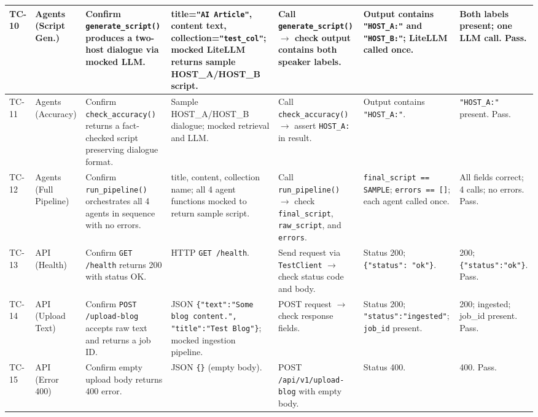 \documentclass[sigconf,natbib=false]{acmart}   %
\begin{document}
{\begin{longtable}{|p{0.6cm}|p{1.4cm}|p{2.0cm}|p{2.3cm}|p{2.3cm}|p{2.3cm}|p{2.3cm}|}
TC-10 & Agents (Script Gen.) & Confirm \texttt{generate\_script()} produces a two-host dialogue via mocked LLM. & title=\texttt{"AI Article"}, content text, collection=\texttt{"test\_col"}; mocked LiteLLM returns sample HOST\_A/HOST\_B script. & Call \texttt{generate\_script()} $\to$ check output contains both speaker labels. & Output contains \texttt{"HOST\_A:"} and \texttt{"HOST\_B:"}; LiteLLM called once. & Both labels present; one LLM call. Pass.\\
\hline

TC-11 & Agents (Accuracy) & Confirm \texttt{check\_accuracy()} returns a fact-checked script preserving dialogue format. & Sample HOST\_A/HOST\_B dialogue; mocked retrieval and LLM. & Call \texttt{check\_accuracy()} $\to$ assert \texttt{HOST\_A:} in result. & Output contains \texttt{"HOST\_A:"}. & \texttt{"HOST\_A:"} present. Pass.\\
\hline

TC-12 & Agents (Full Pipeline) & Confirm \texttt{run\_pipeline()} orchestrates all 4 agents in sequence with no errors. & title, content, collection name; all 4 agent functions mocked to return sample script. & Call \texttt{run\_pipeline()} $\to$ check \texttt{final\_script}, \texttt{raw\_script}, and \texttt{errors}. & \texttt{final\_script == SAMPLE}; \texttt{errors == []}; each agent called once. & All fields correct; 4 calls; no errors. Pass.\\
\hline

TC-13 & API (Health) & Confirm \texttt{GET /health} returns 200 with status OK. & HTTP \texttt{GET /health}. & Send request via \texttt{TestClient} $\to$ check status code and body. & Status 200; \texttt{\{"status": "ok"\}}. & 200; \texttt{\{"status":"ok"\}}. Pass.\\
\hline

TC-14 & API (Upload Text) & Confirm \texttt{POST /upload-blog} accepts raw text and returns a job ID. & JSON \texttt{\{"text":"Some blog content.", "title":"Test Blog"\}}; mocked ingestion pipeline. & POST request $\to$ check response fields. & Status 200; \texttt{"status":"ingested"}; \texttt{job\_id} present. & 200; ingested; job\_id present. Pass.\\
\hline

TC-15 & API (Error 400) & Confirm empty upload body returns 400 error. & JSON \texttt{\{\}} (empty body). & POST \texttt{/api/v1/upload-blog} with empty body. & Status 400. & 400. Pass.\\
\hline


\end{longtable}}
\end{document}
